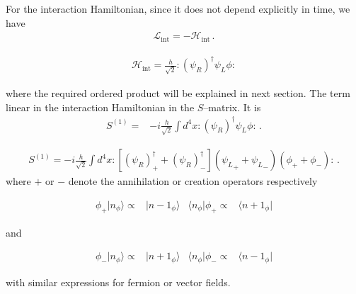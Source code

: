 \begin{frame}
For the interaction Hamiltonian, since it does not depend explicitly in time, we have
\begin{align}
  \mathcal{L}_{\text{int}}=  -\mathcal{H}_{\text{int}}\,.
\end{align}

\begin{align}
\label{eq:hppp}
  \mathcal{H}_{\text{int}}=\frac{h}{\sqrt{2}}:(\psi_R)^{\dagger}{\psi_L}\phi:
\end{align}

where the required ordered product will be explained in next section.
The term linear in the interaction Hamiltonian in the $S$--matrix.  It is
\begin{align}
  S^{(1)}=&-i \frac{h}{\sqrt{2}} \int d^4x:(\psi_R)^{\dagger}{\psi_L}\phi:\,.
\end{align}

\begin{align}
  S^{(1)}=-i \frac{h}{\sqrt{2}} \int d^4x:[(\psi_R)^{\dagger}_++(\psi_R)^{\dagger}_-]({\psi_L}_++{\psi_L}_-)(\phi_++\phi_-):\,.
\end{align}
where $+$ or $-$ denote the annihilation or creation operators respectively
\end{frame}
\begin{align}
 \phi_{+} | n_{\phi} \rangle  \propto& |n-1_{\phi}\rangle & \langle n_{\phi}|\phi_{+} \propto& \langle n+1_{\phi}|
\end{align}

and

\begin{align}
 \phi_{-} |n_{\phi}\rangle  \propto& |n+1_{\phi}\rangle&  \langle n_{\phi}| \phi_{-} \propto& \langle n-1_{\phi}|
\end{align}

with similar expressions for fermion or vector fields.

